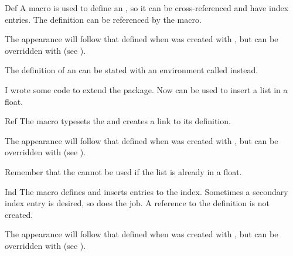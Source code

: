 \documentclass[11pt, outputdir = ./out]{article}
\begin{document}
\begin{Macro*}{Def}{}{}
    A macro  is used to define an , so it can be cross-referenced and have index entries. The definition can be referenced by the  macro.

    The appearance will follow that defined when  was created with , but can be overridden with  (see ).

    The definition of an  can be stated with an environment called \hyperref[environmentdef]{} instead.
\end{Macro*}

\begin{example}{}
    I wrote some code to extend the  package. Now  can be used to insert a list in a float.
\end{example}

\begin{Macro*}{Ref}{}{}
    The macro  typesets the  and creates a link to its definition.

    The appearance will follow that defined when  was created with , but can be overridden with  (see ).
\end{Macro*}

\begin{example}{}
    Remember that the  cannot be used if the list is already in a float.
\end{example}

\begin{Macro*}{Ind}{}{}
    The  macro defines  and inserts entries to the index. Sometimes a secondary index entry is desired, so  does the job. A reference to the definition is not created.

    The appearance will follow that defined when  was created with , but can be overridden with  (see ).
\end{Macro*}
\end{document}
